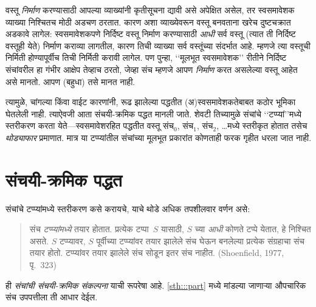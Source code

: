 वस्तू
\emph{निर्माण}
करण्यासाठी
आपल्या
व्याख्यांनी
कृतीसूचना
द्यावी असे
अपेक्षित
असेल, तर
स्वसमावेशक
व्याख्या
निश्चितच
मोठी अडचण
ठरतात.
कारण अशा
व्याख्येवरून
वस्तू बनवताना
खरेच
दुष्टचक्रात
अडकावे
लागेल:
स्वसमावेशकपणे
निर्दिष्ट
वस्तू निर्माण
करण्यासाठी
\emph{आधी} सर्व
वस्तू
(त्यात ती
निर्दिष्ट
वस्तूही येते)
निर्माण कराव्या
लागतील,
कारण तिची
व्याख्या
सर्व वस्तूंच्या
संदर्भात आहे.
म्हणजे त्या
वस्तूची
निर्मिती
होण्यापूर्वीच
तिची निर्मिती
करावी लागेल.
पण पुन्हा,
‘‘मूलभूत
स्वसमावेशक’’
रीतीने
निर्दिष्ट
संचांवरील
हा गंभीर
आक्षेप
तेव्हाच
ठरतो,
जेव्हा
संच म्हणजे
आपण
\emph{निर्माण}
करत असलेल्या
वस्तू आहेत
असे मानतो.
आपण
(बहुधा)
तसे मानत
नाही.

त्यामुळे,
चांगल्या किंवा
वाईट कारणांनी,
रूढ झालेल्या
पद्धतीत
(अ)स्वसमावेशकतेबाबत
कठोर भूमिका
घेतलेली नाही.
त्याऐवजी
आता संचयी-क्रमिक
पद्धत मानली
जाते. शेवटी
तिच्यामुळे
संचांचे
‘‘टप्प्यां’’मध्ये
स्तरीकरण करता
येते---स्वसमावेशरहित
पद्धतीत वस्तू
संच$_0$,
संच$_1$,
संच$_2$,
\ldots मध्ये
स्तरीकृत
होतात तसेच
\emph{थोड्याफार}
प्रमाणात.
मात्र या
टप्प्यांतील
संचांच्या
मूलभूत प्रकारांत
कोणताही
फरक गृहीत
धरला जात
नाही.








\section{संचयी-क्रमिक पद्धत}\label{sth:story:approach:sec}

संचांचे टप्प्यांमध्ये
स्तरीकरण कसे
करायचे, याचे
थोडे अधिक
तपशीलवार
वर्णन असे:
\begin{quote}
  संच \emph{टप्प्यांमध्ये}
  तयार होतात.
  प्रत्येक टप्पा~$S$
  यासाठी, $S$ च्या \emph{आधी}
  कोणते टप्पे येतात, हे निश्चित असते.
  $S$ टप्प्यावर,
  $S$ पूर्वीच्या
  टप्प्यांवर
  तयार झालेले
  संच घेऊन
  बनलेल्या
  प्रत्येक
  संग्रहाचा
  संच तयार
  होतो.
  टप्प्यांवर
  तयार झालेले
  संच सोडून
  इतर संच
  नाहीत.
  (Shoenfield, 1977, पृ.~323)
\end{quote}
ही \emph{संचांची
संचयी-क्रमिक
संकल्पना}
याची रूपरेषा
आहे. \ref{sth:::part}
मध्ये मांडल्या
जाणाऱ्या
औपचारिक
संच उपपत्तीला
ती आधार
देईल.

